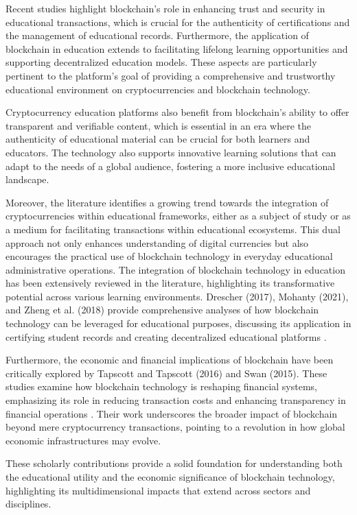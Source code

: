 \documentclass[12pt]{report}
\begin{document}
Recent studies highlight blockchain's role in enhancing trust and security in educational transactions, which is crucial for the authenticity of certifications and the management of educational records. Furthermore, the application of blockchain in education extends to facilitating lifelong learning opportunities and supporting decentralized education models. These aspects are particularly pertinent to the platform's goal of providing a comprehensive and trustworthy educational environment on cryptocurrencies and blockchain technology.

Cryptocurrency education platforms also benefit from blockchain's ability to offer transparent and verifiable content, which is essential in an era where the authenticity of educational material can be crucial for both learners and educators. The technology also supports innovative learning solutions that can adapt to the needs of a global audience, fostering a more inclusive educational landscape.

Moreover, the literature identifies a growing trend towards the integration of cryptocurrencies within educational frameworks, either as a subject of study or as a medium for facilitating transactions within educational ecosystems. This dual approach not only enhances understanding of digital currencies but also encourages the practical use of blockchain technology in everyday educational administrative operations.
The integration of blockchain technology in education has been extensively reviewed in the literature, highlighting its transformative potential across various learning environments. Drescher (2017), Mohanty (2021), and Zheng et al. (2018) provide comprehensive analyses of how blockchain technology can be leveraged for educational purposes, discussing its application in certifying student records and creating decentralized educational platforms \cite{drescher2017, mohanty2021, zheng2018}.

Furthermore, the economic and financial implications of blockchain have been critically explored by Tapscott and Tapscott (2016) and Swan (2015). These studies examine how blockchain technology is reshaping financial systems, emphasizing its role in reducing transaction costs and enhancing transparency in financial operations \cite{tapscott2016, swan2015}. Their work underscores the broader impact of blockchain beyond mere cryptocurrency transactions, pointing to a revolution in how global economic infrastructures may evolve.

These scholarly contributions provide a solid foundation for understanding both the educational utility and the economic significance of blockchain technology, highlighting its multidimensional impacts that extend across sectors and disciplines.
\end{document}
